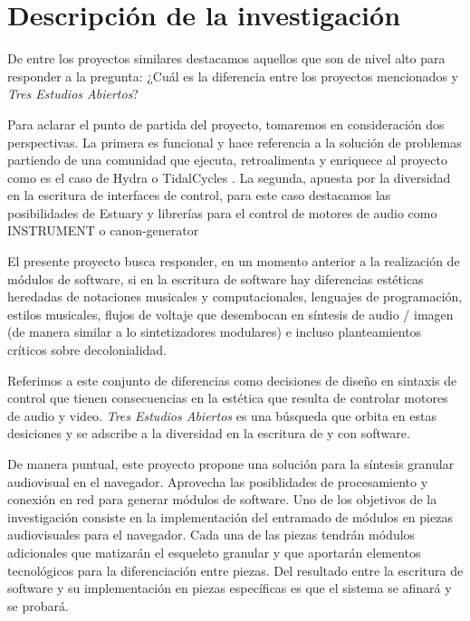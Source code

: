 \section*{Descripción de la investigación} %

De entre los proyectos similares destacamos aquellos que son de nivel alto para responder a la pregunta: ¿Cuál es la diferencia entre los proyectos mencionados y \textit{Tres Estudios Abiertos}?

Para aclarar el punto de partida del proyecto, tomaremos en consideración dos perspectivas. La primera es funcional y hace referencia a la solución de problemas partiendo de una comunidad que ejecuta, retroalimenta y enriquece al proyecto como es el caso de Hydra \citep{hydra} o TidalCycles \citep{tidal}. La segunda, apuesta por la diversidad en la escritura de interfaces de control, para este caso destacamos las posibilidades de Estuary \citep{estuary} y librerías para el control de motores de audio como INSTRUMENT \citep{instrument} o canon-generator \citep{canongenerator}

El presente proyecto busca responder, en un momento anterior a la realización de módulos de software, si en la escritura de software hay diferencias estéticas heredadas de notaciones musicales y computacionales, lenguajes de programación, estilos musicales, flujos de voltaje que desembocan en síntesis de audio / imagen (de manera similar a lo sintetizadores modulares) e incluso planteamientos críticos sobre decolonialidad.

Referimos a este conjunto de diferencias como decisiones de diseño en sintaxis de control que tienen consecuencias en la estética que resulta de controlar motores de audio y video. \textit{Tres Estudios Abiertos} es una búsqueda que orbita en estas desiciones y se adscribe a la diversidad en la escritura de y con software. 

De manera puntual, este proyecto propone una solución para la síntesis granular audiovisual en el navegador. Aprovecha las posiblidades de procesamiento y conexión en red para generar módulos de software. Uno de los objetivos de la investigación consiste en la implementación del entramado de módulos en piezas audiovisuales para el navegador. Cada una de las piezas tendrán módulos adicionales que matizarán el esqueleto granular y que aportarán elementos tecnológicos para la diferenciación entre piezas. Del resultado entre la escritura de software y su implementación en piezas específicas es que el sistema se afinará y se probará. 

